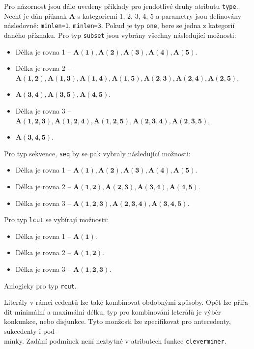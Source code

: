 Pro názornost jsou dále uvedeny příklady pro jendotlivé druhy atributu \texttt{type}. Nechť je dán příznak $\mathbf{A}$ s kategoriemi 1, 2, 3, 4, 5 a parametry jsou definovány následovně: \texttt{minlen=1}, \texttt{minlen=3}. Pokud je typ \texttt{one}, bere se jedna z kategorií daného příznaku. Pro typ \texttt{subset} jsou vybrány všechny následující možnosti:
\begin{itemize}
    \itemsep0em
    \item Délka je rovna 1 --  $\mathbf{A(1), A(2), A(3), A(4), A(5)}.$
    \item Délka je rovna 2 --  $\mathbf{A(1, 2), A(1, 3), A(1, 4), A(1, 5), A(2, 3), A(2, 4), A(2, 5)},$
    \item[] $\mathbf{A(3, 4), A(3, 5), A(4, 5)}.$
    \item Délka je rovna 3 --  $\mathbf{A(1, 2, 3), A(1, 2, 4), A(1, 2, 5),A(2, 3, 4), A(2, 3, 5),}$
    \item[] $\mathbf{A(3, 4, 5)}$.\cite{bib:GUHA}
\end{itemize}
Pro typ sekvence, \texttt{seq} by se pak vybraly následující možnosti:
\begin{itemize}
    \itemsep0em
    \item Délka je rovna 1 --  $\mathbf{A(1), A(2), A(3), A(4), A(5)}.$
    \item Délka je rovna 2 --  $\mathbf{A(1, 2), A(2, 3), A(3, 4), A(4, 5)}.$
    \item Délka je rovna 3 --  $\mathbf{A(1, 2, 3), A(2, 3, 4), A(3, 4, 5)}$.\cite{bib:GUHA}
\end{itemize}

Pro typ \texttt{lcut} se vybírají možnosti:
\begin{itemize}
    \itemsep0em
    \item Délka je rovna 1 --  $\mathbf{A(1)}.$
    \item Délka je rovna 2 --  $\mathbf{A(1, 2)}.$
    \item Délka je rovna 3 --  $\mathbf{A(1, 2, 3)}$.\cite{bib:GUHA}
\end{itemize}
Anlogicky pro typ \texttt{rcut}.

Literály v rámci cedentů lze také kombinovat obdobnými způsoby. Opět lze přiřa-\\dit minimální a maximální délku, typ pro kombinování leterálů je výběr konkunkce, nebo disjunkce. Tyto monžosti lze zpecifikovat pro antecedenty, sukcedenty i pod-\\mínky. Zadání podmínek není nezbytné v atributech funkce \texttt{cleverminer}.


